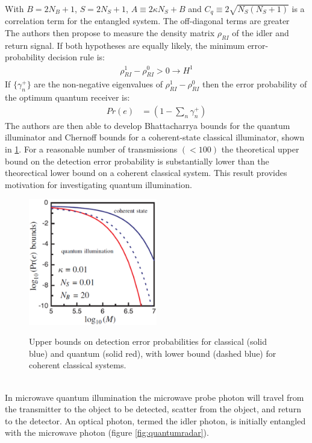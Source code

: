 \documentclass[a4paper,11pt, twocolumn]{article}
\numberwithin{equation}{section}
\begin{document}
With $B=2N_B+1$, $S=2N_S+1$, $A \equiv 2\kappa N_S+B$ and $C_q \equiv 2\sqrt{N_S(N_S+1)}$ is a correlation term for the entangled system.
The off-diagonal terms are greater
\\
The authors then propose to measure the density matrix $\rho_{RI}$ of the idler and return signal.
If both hypotheses are equally likely, the minimum error-probability decision rule is:
\begin{align}
 \rho_{RI}^1-\rho_{RI}^0 > 0 \rightarrow H^1
\end{align}
If $\{\gamma_n^+\}$ are the non-negative eigenvalues of $\rho_{RI}^1-\rho_{RI}^0$ then the error probability of the optimum quantum receiver is:
\begin{align}
 Pr(e) &= \left(1-\sum_n \gamma_n^+\right)
\end{align}
The authors are then able to develop Bhattacharrya bounds for the quantum illuminator and Chernoff bounds for a coherent-state classical illuminator, shown in \ref{fig:opticalerrorbounds}.
For a reasonable number of transmissions $(<100)$ the theoretical upper bound on the detection error probability is substantially lower than the theorectical lower bound on a coherent classical system.
This result provides motivation for investigating quantum illumination.
\begin{figure}
 \caption{Upper bounds on detection error probabilities for classical (solid blue) and quantum (solid red), with lower bound (dashed blue) for coherent classical systems. \cite{qig}}
 \centering
   \includegraphics[width=0.5\textwidth]{figs/ErrorBoundsOptical}
 \label{fig:opticalerrorbounds}
\end{figure}
\\
In microwave quantum illumination the microwave probe photon will travel from the transmitter to the object to be detected, scatter from the object, and return to the detector.
An optical photon, termed the idler photon, is initially entangled with the microwave photon (figure \ref{fig:quantumradar}).
\end{document}
